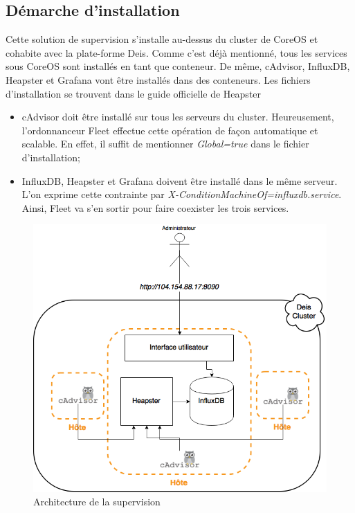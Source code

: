 \begin{onehalfspace}
\subsection{Démarche d'installation}

Cette solution de supervision s'installe au-dessus du cluster de CoreOS et cohabite avec la plate-forme Deis. Comme c'est déjà mentionné, tous les services sous CoreOS sont installés en tant que conteneur. De même, cAdvisor, InfluxDB, Heapster et Grafana vont être installés dans des conteneurs.
Les fichiers d'installation se trouvent dans le guide officielle de Heapster \cite{heapster-coreos}

\begin{itemize}
	\item cAdvisor doit être installé sur tous les serveurs du cluster. Heureusement, l'ordonnanceur Fleet effectue cette opération de façon automatique et scalable. En effet, il suffit de mentionner \emph{Global=true} dans le fichier d'installation;
	\item InfluxDB, Heapster et Grafana doivent être installé dans le même serveur. L'on exprime cette contrainte par \emph{X-ConditionMachineOf=influxdb.service}. Ainsi, Fleet va s'en sortir pour faire coexister les trois services.
\end{itemize}

\begin{figure}[H]
\centering
\includegraphics [scale=0.6]{chapitre5/assets/monitoring-cluster}
\caption{Architecture de la supervision}
\label{fig:}
\end{figure}


\end{onehalfspace}
